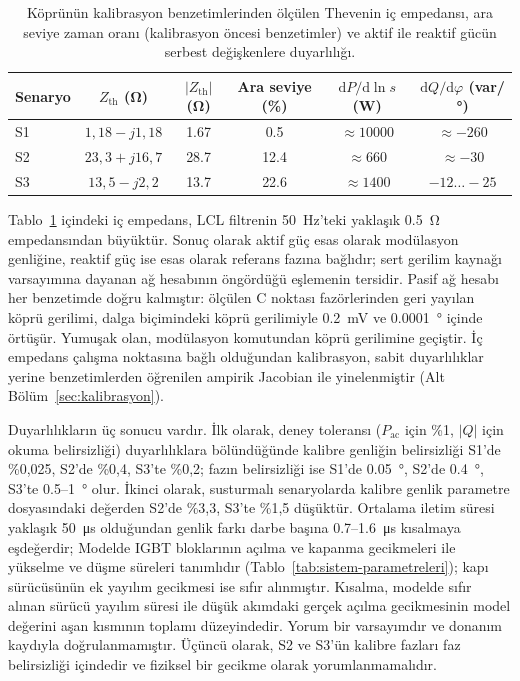 \begin{table}[htbp]
  \centering
  \caption{Köprünün kalibrasyon benzetimlerinden ölçülen Thevenin iç empedansı, ara seviye zaman oranı (kalibrasyon öncesi benzetimler) ve aktif ile reaktif gücün serbest değişkenlere duyarlılığı.}
  \label{tab:kopru-ic-empedansi}
  \small
  \setlength{\tabcolsep}{4pt}
  \begin{tabular}{l c c c c c}
    \toprule
    Senaryo & $Z_{\mathrm{th}}$ (\si{\ohm}) & $|Z_{\mathrm{th}}|$ (\si{\ohm}) & Ara seviye (\%) & $\mathrm{d}P/\mathrm{d}\ln s$ (\si{\watt}) & $\mathrm{d}Q/\mathrm{d}\varphi$ (var/\si{\degree}) \\
    \midrule
    S1 & $1{,}18-j1{,}18$ & \num{1.67} & \num{0.5} & $\approx\num{10000}$ & $\approx-260$ \\
    S2 & $23{,}3+j16{,}7$ & \num{28.7} & \num{12.4} & $\approx\num{660}$ & $\approx-30$ \\
    S3 & $13{,}5-j2{,}2$ & \num{13.7} & \num{22.6} & $\approx\num{1400}$ & $-12\ldots-25$ \\
    \bottomrule
  \end{tabular}
\end{table}

Tablo~\ref{tab:kopru-ic-empedansi} içindeki iç empedans, LCL filtrenin \SI{50}{\hertz}'teki yaklaşık \SI{0.5}{\ohm} empedansından büyüktür. Sonuç olarak aktif güç esas olarak modülasyon genliğine, reaktif güç ise esas olarak referans fazına bağlıdır; sert gerilim kaynağı varsayımına dayanan ağ hesabının öngördüğü eşlemenin tersidir. Pasif ağ hesabı her benzetimde doğru kalmıştır: ölçülen C noktası fazörlerinden geri yayılan köprü gerilimi, dalga biçimindeki köprü gerilimiyle \SI{0.2}{\milli\volt} ve \SI{0.0001}{\degree} içinde örtüşür. Yumuşak olan, modülasyon komutundan köprü gerilimine geçiştir. İç empedans çalışma noktasına bağlı olduğundan kalibrasyon, sabit duyarlılıklar yerine benzetimlerden öğrenilen ampirik Jacobian ile yinelenmiştir (Alt Bölüm~\ref{sec:kalibrasyon}).

Duyarlılıkların üç sonucu vardır. İlk olarak, deney toleransı ($P_{\mathrm{ac}}$ için \%1, $|Q|$ için okuma belirsizliği) duyarlılıklara bölündüğünde kalibre genliğin belirsizliği S1'de \%0,025, S2'de \%0,4, S3'te \%0,2; fazın belirsizliği ise S1'de \SI{0.05}{\degree}, S2'de \SI{0.4}{\degree}, S3'te \num{0.5}--\SI{1}{\degree} olur. İkinci olarak, susturmalı senaryolarda kalibre genlik parametre dosyasındaki değerden S2'de \%3,3, S3'te \%1,5 düşüktür. Ortalama iletim süresi yaklaşık \SI{50}{\micro\second} olduğundan genlik farkı darbe başına \num{0.7}--\SI{1.6}{\micro\second} kısalmaya eşdeğerdir; Modelde IGBT bloklarının açılma ve kapanma gecikmeleri ile yükselme ve düşme süreleri tanımlıdır (Tablo~\ref{tab:sistem-parametreleri}); kapı sürücüsünün ek yayılım gecikmesi ise sıfır alınmıştır. Kısalma, modelde sıfır alınan sürücü yayılım süresi ile düşük akımdaki gerçek açılma gecikmesinin model değerini aşan kısmının toplamı düzeyindedir. Yorum bir varsayımdır ve donanım kaydıyla doğrulanmamıştır. Üçüncü olarak, S2 ve S3'ün kalibre fazları faz belirsizliği içindedir ve fiziksel bir gecikme olarak yorumlanmamalıdır.

